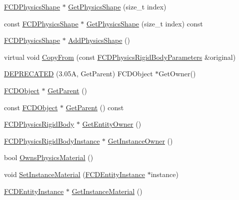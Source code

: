 \begin{DoxyCompactItemize}
\item 
\hyperlink{classFCDPhysicsShape}{FCDPhysicsShape} $\ast$ \hyperlink{classFCDPhysicsRigidBodyParameters_af5061a33fc356789a07e49e7cabb9ccb}{GetPhysicsShape} (size\_\-t index)
\item 
const \hyperlink{classFCDPhysicsShape}{FCDPhysicsShape} $\ast$ \hyperlink{classFCDPhysicsRigidBodyParameters_a74c74106dde9897d0e9d7a3021890b2a}{GetPhysicsShape} (size\_\-t index) const 
\item 
\hyperlink{classFCDPhysicsShape}{FCDPhysicsShape} $\ast$ \hyperlink{classFCDPhysicsRigidBodyParameters_af9f3cc594af1352904b602f8f930e355}{AddPhysicsShape} ()
\item 
virtual void \hyperlink{classFCDPhysicsRigidBodyParameters_ae03738a47de5ef3383078e4cab8d29b4}{CopyFrom} (const \hyperlink{classFCDPhysicsRigidBodyParameters}{FCDPhysicsRigidBodyParameters} \&original)
\item 
\hyperlink{classFCDPhysicsRigidBodyParameters_a7850ceb66874aee3ac4f45c7be4b0464}{DEPRECATED} (3.05A, GetParent) FCDObject $\ast$GetOwner()
\item 
\hyperlink{classFCDObject}{FCDObject} $\ast$ \hyperlink{classFCDPhysicsRigidBodyParameters_a1c9bec0ce91d991ba5ae6da1c935ef3d}{GetParent} ()
\item 
const \hyperlink{classFCDObject}{FCDObject} $\ast$ \hyperlink{classFCDPhysicsRigidBodyParameters_a45d33a0be1cfa9b7b68f0bf9f80b361c}{GetParent} () const 
\item 
\hyperlink{classFCDPhysicsRigidBody}{FCDPhysicsRigidBody} $\ast$ \hyperlink{classFCDPhysicsRigidBodyParameters_a5a3abb1ebc9d47867ddc84609ff125b1}{GetEntityOwner} ()
\item 
\hyperlink{classFCDPhysicsRigidBodyInstance}{FCDPhysicsRigidBodyInstance} $\ast$ \hyperlink{classFCDPhysicsRigidBodyParameters_ac403403599364bfff22c0f8a1e15b829}{GetInstanceOwner} ()
\item 
bool \hyperlink{classFCDPhysicsRigidBodyParameters_ad00ea97cbc7daa31a2f5c2c0aa093e4a}{OwnsPhysicsMaterial} ()
\item 
void \hyperlink{classFCDPhysicsRigidBodyParameters_a5de70380bafbbefd31054881c972ea02}{SetInstanceMaterial} (\hyperlink{classFCDEntityInstance}{FCDEntityInstance} $\ast$instance)
\item 
\hyperlink{classFCDEntityInstance}{FCDEntityInstance} $\ast$ \hyperlink{classFCDPhysicsRigidBodyParameters_a9f7045ad53397230134e888c2b77404f}{GetInstanceMaterial} ()
\end{DoxyCompactItemize}


